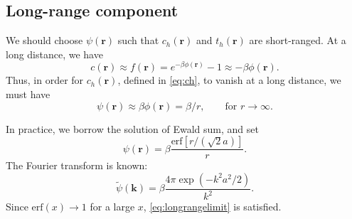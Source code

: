 \documentclass[12pt]{article}
\newcommand{\vct}[1]{\mathbf{#1}}
\providecommand{\vr}{} %
\renewcommand{\vr}{\vct{r}}
\newcommand{\vk}{\vct{k}}
\newcommand{\erf}{\mathrm{erf}}
\begin{document}
\subsection{Long-range component}

We should choose $\psi(\vr)$ such that $c_h(\vr)$ and $t_h(\vr)$ are short-ranged.
%
At a long distance, we have
\[
  c(\vr) \approx f(\vr)
         = e^{-\beta \phi(\vr)} - 1
         \approx -\beta \phi(\vr).
\]
Thus, in order for $c_h(\vr)$, defined in \eqref{eq:ch}, to vanish at a long distance,
we must have
\begin{equation}
  \psi(\vr) \approx \beta \phi(\vr)
            = \beta/r,
  \qquad \mbox{for $r \rightarrow \infty$}.
\label{eq:longrangelimit}
\end{equation}

In practice, we borrow the solution of Ewald sum, and set
\[
  \psi(\vr) = \beta \frac{ \erf\left[ r/(\sqrt{2} a) \right] }{ r }.
\]
The Fourier transform is known:
\[
  \tilde{\psi}(\vk) = \beta \frac{ 4 \pi \exp(-k^2 a^2/2) } { k^2 }.
\]
Since $\erf(x) \rightarrow 1$ for a large $x$,
\eqref{eq:longrangelimit} is satisfied.
\end{document}
